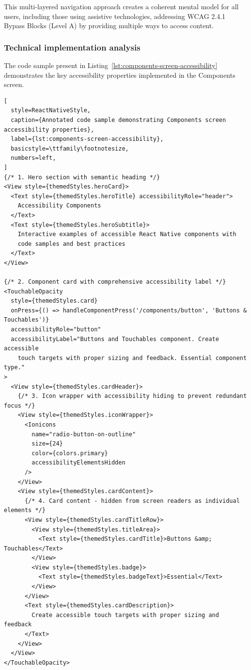 This multi-layered navigation approach creates a coherent mental model for all users, including those using assistive technologies, addressing WCAG 2.4.1 Bypass Blocks (Level A) by providing multiple ways to access content.

\FloatBarrier

\subsubsection{Technical implementation analysis}

The code sample present in Listing~\ref{lst:components-screen-accessibility} demonstrates the key accessibility properties implemented in the Components screen.

\begin{lstlisting}[
  style=ReactNativeStyle,
  caption={Annotated code sample demonstrating Components screen accessibility properties},
  label={lst:components-screen-accessibility},
  basicstyle=\ttfamily\footnotesize,
  numbers=left,
]
{/* 1. Hero section with semantic heading */}
<View style={themedStyles.heroCard}>
  <Text style={themedStyles.heroTitle} accessibilityRole="header">
    Accessibility Components
  </Text>
  <Text style={themedStyles.heroSubtitle}>
    Interactive examples of accessible React Native components with 
    code samples and best practices
  </Text>
</View>

{/* 2. Component card with comprehensive accessibility label */}
<TouchableOpacity
  style={themedStyles.card}
  onPress={() => handleComponentPress('/components/button', 'Buttons & Touchables')}
  accessibilityRole="button"
  accessibilityLabel="Buttons and Touchables component. Create accessible 
    touch targets with proper sizing and feedback. Essential component type."
>
  <View style={themedStyles.cardHeader}>
    {/* 3. Icon wrapper with accessibility hiding to prevent redundant focus */}
    <View style={themedStyles.iconWrapper}>
      <Ionicons
        name="radio-button-on-outline"
        size={24}
        color={colors.primary}
        accessibilityElementsHidden
      />
    </View>
    <View style={themedStyles.cardContent}>
      {/* 4. Card content - hidden from screen readers as individual elements */}
      <View style={themedStyles.cardTitleRow}>
        <View style={themedStyles.titleArea}>
          <Text style={themedStyles.cardTitle}>Buttons &amp; Touchables</Text>
        </View>
        <View style={themedStyles.badge}>
          <Text style={themedStyles.badgeText}>Essential</Text>
        </View>
      </View>
      <Text style={themedStyles.cardDescription}>
        Create accessible touch targets with proper sizing and feedback
      </Text>
    </View>
  </View>
</TouchableOpacity>
\end{lstlisting}

